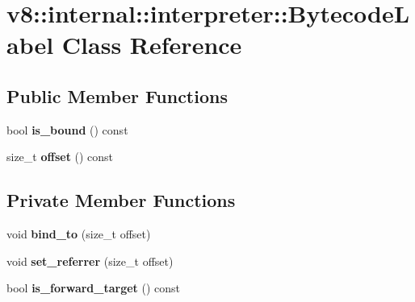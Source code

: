 \hypertarget{classv8_1_1internal_1_1interpreter_1_1_bytecode_label}{}\section{v8\+:\+:internal\+:\+:interpreter\+:\+:Bytecode\+Label Class Reference}
\label{classv8_1_1internal_1_1interpreter_1_1_bytecode_label}
\subsection*{Public Member Functions}
\begin{DoxyCompactItemize}
\item 
bool {\bfseries is\+\_\+bound} () const \hypertarget{classv8_1_1internal_1_1interpreter_1_1_bytecode_label_a83a10413b1c93bb53c4ea32d57c8fdc9}{}\label{classv8_1_1internal_1_1interpreter_1_1_bytecode_label_a83a10413b1c93bb53c4ea32d57c8fdc9}

\item 
size\+\_\+t {\bfseries offset} () const \hypertarget{classv8_1_1internal_1_1interpreter_1_1_bytecode_label_aa1bea501a5cbf4d9f2839aede4b030d2}{}\label{classv8_1_1internal_1_1interpreter_1_1_bytecode_label_aa1bea501a5cbf4d9f2839aede4b030d2}

\end{DoxyCompactItemize}
\subsection*{Private Member Functions}
\begin{DoxyCompactItemize}
\item 
void {\bfseries bind\+\_\+to} (size\+\_\+t offset)\hypertarget{classv8_1_1internal_1_1interpreter_1_1_bytecode_label_ae3df2a6ba90d4636835e986cb3231e08}{}\label{classv8_1_1internal_1_1interpreter_1_1_bytecode_label_ae3df2a6ba90d4636835e986cb3231e08}

\item 
void {\bfseries set\+\_\+referrer} (size\+\_\+t offset)\hypertarget{classv8_1_1internal_1_1interpreter_1_1_bytecode_label_ac570aa837677819c46b48dc90da8ec4e}{}\label{classv8_1_1internal_1_1interpreter_1_1_bytecode_label_ac570aa837677819c46b48dc90da8ec4e}

\item 
bool {\bfseries is\+\_\+forward\+\_\+target} () const \hypertarget{classv8_1_1internal_1_1interpreter_1_1_bytecode_label_a4414c0b220bf077917bd81c52a6e6075}{}\label{classv8_1_1internal_1_1interpreter_1_1_bytecode_label_a4414c0b220bf077917bd81c52a6e6075}

\end{DoxyCompactItemize}
